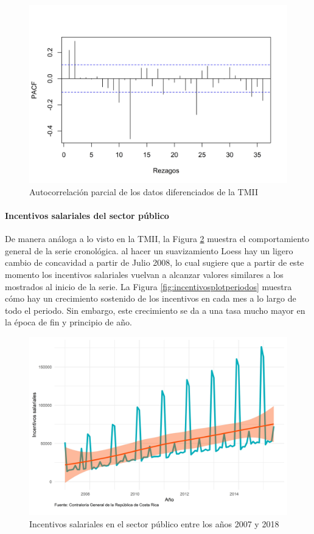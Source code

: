 \documentclass[
]{article}
\begin{document}
\begin{figure}[H]
\includegraphics[width=1\linewidth,height=1\textheight]{Tesis_files/figure-latex/tmii_pacf-1} \caption{Autocorrelación parcial de los datos diferenciados de la TMII}\label{fig:tmii_pacf}
\end{figure}

\paragraph{Incentivos salariales del sector público}

De manera análoga a lo visto en la TMII, la Figura
\ref{fig:incentivosplotgeneral} muestra el comportamiento general de la
serie cronológica. al hacer un suavizamiento Loess hay un ligero cambio
de concavidad a partir de Julio 2008, lo cual sugiere que a partir de
este momento los incentivos salariales vuelvan a alcanzar valores
similares a los mostrados al inicio de la serie. La Figura
\ref{fig:incentivosplotperiodos} muestra cómo hay un crecimiento
sostenido de los incentivos en cada mes a lo largo de todo el periodo.
Sin embargo, este crecimiento se da a una tasa mucho mayor en la época
de fin y principio de año.

\begin{figure}[H]
\includegraphics[width=1\linewidth,height=1\textheight]{Tesis_files/figure-latex/incentivosplotgeneral-1} \caption{Incentivos salariales en el sector público entre los años 2007 y 2018}\label{fig:incentivosplotgeneral}
\end{figure}
\end{document}
